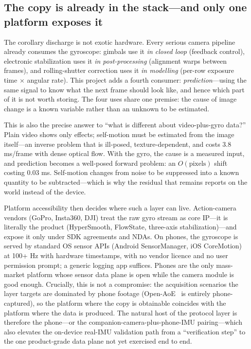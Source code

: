 \documentclass[12pt,a4paper]{article}
\begin{document}
\subsection{The copy is already in the stack---and only one platform exposes it}
\label{sec:stack}

The corollary discharge is not exotic hardware. Every serious camera pipeline already consumes the gyroscope: gimbals use it \emph{in closed loop} (feedback control), electronic stabilization uses it \emph{in post-processing} (alignment warps between frames), and rolling-shutter correction uses it \emph{in modelling} (per-row exposure time $\times$ angular rate). This project adds a fourth consumer: \emph{prediction}---using the same signal to know what the next frame should look like, and hence which part of it is not worth storing. The four uses share one premise: the cause of image change is a known variable rather than an unknown to be estimated.

This is also the precise answer to ``what is different about video-plus-gyro data?'' Plain video shows only effects; self-motion must be estimated from the image itself---an inverse problem that is ill-posed, texture-dependent, and costs 3.8 ms/frame with dense optical flow. With the gyro, the cause is a measured input, and prediction becomes a well-posed forward problem: an $O(\text{pixels})$ shift costing 0.03 ms. Self-motion changes from noise to be suppressed into a known quantity to be subtracted---which is why the residual that remains reports on the world instead of the device.

Platform accessibility then decides where such a layer can live. Action-camera vendors (GoPro, Insta360, DJI) treat the raw gyro stream as core IP---it is literally the product (HyperSmooth, FlowState, three-axis stabilization)---and expose it only under SDK agreements and NDAs. On phones, the gyroscope is served by standard OS sensor APIs (Android SensorManager, iOS CoreMotion) at 100+ Hz with hardware timestamps, with no vendor licence and no user permission prompt; a generic logging app suffices. Phones are the only mass-market platform whose sensor data plane is open while the camera module is good enough. Crucially, this is not a compromise: the acquisition scenarios the layer targets are dominated by phone footage (Open-AoE~\cite{openaoe} is entirely phone-captured), so the platform where the copy is obtainable coincides with the platform where the data is produced. The natural host of the protocol layer is therefore the phone---or the companion-camera-plus-phone-IMU pairing---which also elevates the on-device real-IMU validation path from a ``verification step'' to the one product-grade data plane not yet exercised end to end.
\end{document}
